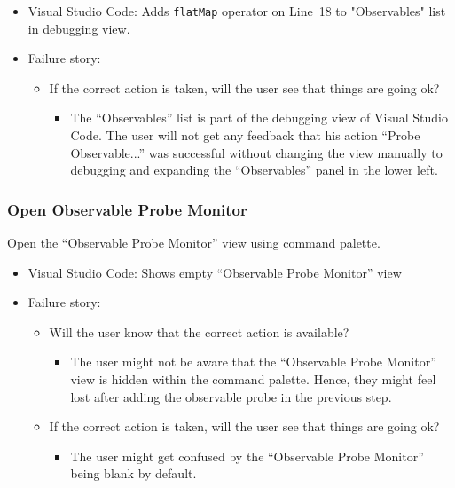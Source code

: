 \documentclass[sigplan,screen,nonacm,review]{acmart}
\begin{document}
\begin{itemize}
	\item Visual Studio Code: Adds \texttt{flatMap} operator on Line~18 to "Observables" list in debugging view.
	\item Failure story:
	      \begin{itemize}
	      	\item If the correct action is taken, will the user see that things are going ok?
	      	      \begin{itemize}
	      	      	\item The ``Observables'' list is part of the debugging view of Visual Studio Code. The user will not get any feedback that his action ``Probe Observable...'' was successful without changing the view manually to debugging and expanding the ``Observables'' panel in the lower left.
	      	      \end{itemize}
	      \end{itemize}
\end{itemize}


\subsubsection{Open Observable Probe Monitor}
Open the ``Observable Probe Monitor'' view using command palette.

\begin{itemize}
	\item Visual Studio Code: Shows empty ``Observable Probe Monitor'' view
	\item Failure story:
	      \begin{itemize}
	      	\item Will the user know that the correct action is available?
	      	      \begin{itemize}
	      	      	\item The user might not be aware that the ``Observable Probe Monitor'' view is hidden within the command palette. Hence, they might feel lost after adding the observable probe in the previous step.
	      	      \end{itemize}
	      	\item If the correct action is taken, will the user see that things are going ok?
	      	      \begin{itemize}
	      	      	\item The user might get confused by the ``Observable Probe Monitor'' being blank by default.
	      	      \end{itemize}
	      \end{itemize}
\end{itemize}
\end{document}
